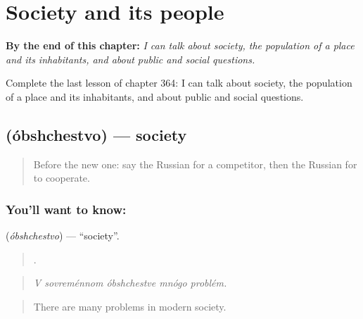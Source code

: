 
\chapter{Society and its people}
\label{ch:ru-society-and-its-people}

\begin{chapteropening}
\textbf{By the end of this chapter:} \emph{I can talk about society, the population of a place and its inhabitants, and about public and social questions.}

Complete the last lesson of chapter 364: I can talk about society, the population of a place and its inhabitants, and about public and social questions.
\end{chapteropening}

\section[\texorpdfstring{\ru{общество} (óbshchestvo)}{общество (óbshchestvo)}]{ (óbshchestvo) — society}

\label{lesson:RU-C364-obshchestvo}



\begin{quote}
Before the new one: say the Russian for a competitor, then the Russian for to cooperate.
\end{quote}

\subsection*{You'll want to know: }
\textbf{} (\emph{óbshchestvo}) — \textquotedblleft{}society\textquotedblright{}.

\begin{quote}
    .
\end{quote}

\begin{quote}
\emph{V sovreménnom óbshchestve mnógo problém.}
\end{quote}

\begin{quote}
There are many problems in modern society.
\end{quote}


